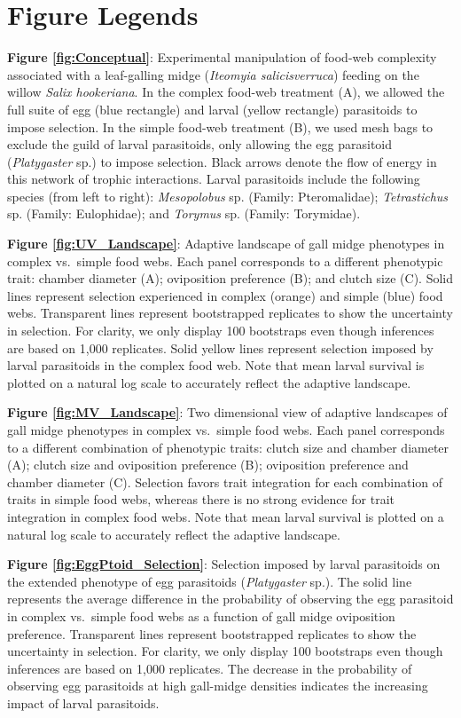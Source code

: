 \documentclass[11pt,]{article}
\begin{document}
\newpage 

\section{Figure Legends}\label{figure-legends}

\textbf{Figure \ref{fig:Conceptual}}: Experimental manipulation of
food-web complexity associated with a leaf-galling midge (\emph{Iteomyia
salicisverruca}) feeding on the willow \emph{Salix hookeriana}. In the
complex food-web treatment (A), we allowed the full suite of egg (blue
rectangle) and larval (yellow rectangle) parasitoids to impose
selection. In the simple food-web treatment (B), we used mesh bags to
exclude the guild of larval parasitoids, only allowing the egg
parasitoid (\emph{Platygaster} sp.) to impose selection. Black arrows
denote the flow of energy in this network of trophic interactions.
Larval parasitoids include the following species (from left to right):
\emph{Mesopolobus} sp. (Family: Pteromalidae); \emph{Tetrastichus} sp.
(Family: Eulophidae); and \emph{Torymus} sp. (Family: Torymidae).

\textbf{Figure \ref{fig:UV_Landscape}}: Adaptive landscape of gall midge
phenotypes in complex vs.~simple food webs. Each panel corresponds to a
different phenotypic trait: chamber diameter (A); oviposition preference
(B); and clutch size (C). Solid lines represent selection experienced in
complex (orange) and simple (blue) food webs. Transparent lines
represent bootstrapped replicates to show the uncertainty in selection.
For clarity, we only display 100 bootstraps even though inferences are
based on 1,000 replicates. Solid yellow lines represent selection
imposed by larval parasitoids in the complex food web. Note that mean
larval survival is plotted on a natural log scale to accurately reflect
the adaptive landscape.

\textbf{Figure \ref{fig:MV_Landscape}}: Two dimensional view of adaptive
landscapes of gall midge phenotypes in complex vs.~simple food webs.
Each panel corresponds to a different combination of phenotypic traits:
clutch size and chamber diameter (A); clutch size and oviposition
preference (B); oviposition preference and chamber diameter (C).
Selection favors trait integration for each combination of traits in
simple food webs, whereas there is no strong evidence for trait
integration in complex food webs. Note that mean larval survival is
plotted on a natural log scale to accurately reflect the adaptive
landscape.

\textbf{Figure \ref{fig:EggPtoid_Selection}}: Selection imposed by
larval parasitoids on the extended phenotype of egg parasitoids
(\emph{Platygaster} sp.). The solid line represents the average
difference in the probability of observing the egg parasitoid in complex
vs.~simple food webs as a function of gall midge oviposition preference.
Transparent lines represent bootstrapped replicates to show the
uncertainty in selection. For clarity, we only display 100 bootstraps
even though inferences are based on 1,000 replicates. The decrease in
the probability of observing egg parasitoids at high gall-midge
densities indicates the increasing impact of larval parasitoids.
\end{document}
